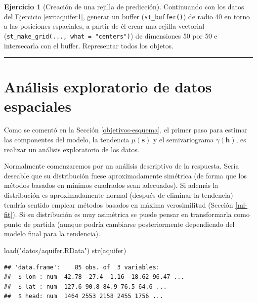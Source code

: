 \documentclass[
  spanish,
]{book}
\newenvironment{Shaded}{\begin{snugshade}}{\end{snugshade}}
\newcommand{\FunctionTok}[1]{\textcolor[rgb]{0.00,0.00,0.00}{#1}}
\newcommand{\NormalTok}[1]{#1}
\newcommand{\StringTok}[1]{\textcolor[rgb]{0.31,0.60,0.02}{#1}}
\theoremstyle{break}
\theoremstyle{definition}
\theoremstyle{definition}
\theoremstyle{definition}
\newtheorem{exercise}{Ejercicio}[chapter]
\theoremstyle{definition}
\theoremstyle{remark}
\begin{document}
\begin{exercise}[Creación de una rejilla de predicción]
\protect\hypertarget{exr:aquifer2}{}{\label{exr:aquifer2} {} }
Continuando con los datos del Ejercicio \ref{exr:aquifer1}, generar un buffer
(\texttt{st\_buffer()}) de radio 40 en torno a las posiciones espaciales, a partir de él crear
una rejilla vectorial (\texttt{st\_make\_grid(...,\ what\ =\ "centers")}) de dimensiones
50 por 50 e intersecarla con el buffer. Representar todos los objetos.
\end{exercise}

\begin{center}\rule{0.5\linewidth}{0.5pt}\end{center}

\hypertarget{sp-eda}{%
\section{Análisis exploratorio de datos espaciales}\label{sp-eda}}

Como se comentó en la Sección \ref{objetivos-esquema}, el primer paso para estimar las componentes del modelo, la tendencia \(\mu(\mathbf{s})\) y el semivariograma \(\gamma(\mathbf{h})\), es realizar un análisis exploratorio de los datos.

Normalmente comenzaremos por un análisis descriptivo de la respuesta.
Sería deseable que su distribución fuese aproximadamente simétrica (de forma que los métodos
basados en mínimos cuadrados sean adecuados).
Si además la distribución es aproximadamente normal (después de eliminar la tendencia) tendría sentido emplear métodos basados en
máxima verosimilitud (Sección \ref{ml-fit}).
Si su distribución es muy asimétrica se puede pensar en transformarla como punto de partida
(aunque podría cambiarse posteriormente dependiendo del modelo final para la tendencia).

\begin{Shaded}
\begin{Highlighting}[]
\FunctionTok{load}\NormalTok{(}\StringTok{"datos/aquifer.RData"}\NormalTok{)}
\FunctionTok{str}\NormalTok{(aquifer)}
\end{Highlighting}
\end{Shaded}

\begin{verbatim}
## 'data.frame':    85 obs. of  3 variables:
##  $ lon : num  42.78 -27.4 -1.16 -18.62 96.47 ...
##  $ lat : num  127.6 90.8 84.9 76.5 64.6 ...
##  $ head: num  1464 2553 2158 2455 1756 ...
\end{verbatim}
\end{document}
